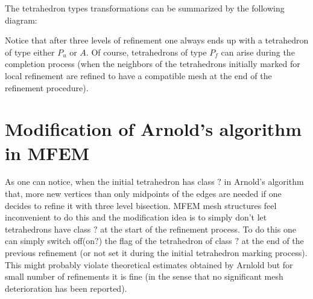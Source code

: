 \documentclass[a4paper,12pt]{amsart}
\numberwithin{equation}{section}
\begin{document}
The tetrahedron types transformations can be summarized by the following diagram:

\begin{center}
\end{center}

Notice that after three levels of refinement one always ends up with a tetrahedron of type either $P_u$ or $A$. Of course, tetrahedrons of type $P_f$ can arise during the completion process (when the neighbors of the tetrahedrons initially marked for local refinement are refined to have a compatible mesh at the end of the refinement procedure).

\section{Modification of Arnold's algorithm in MFEM}

As one can notice, when the initial tetrahedron has class $?$ in Arnold's algorithm that, more new vertices than only midpoints of the edges are needed if one decides to refine it with three level bisection. 
MFEM mesh structures feel inconvenient to do this and the modification idea is to simply don't let tetrahedrons have class $?$ at the start of the refinement process. To do this one can simply switch off(on$?$) the flag of the tetrahedron of class $?$ at the end of the previous refinement (or not set it during the initial tetrahedron marking process).
This might probably violate theoretical estimates obtained by Arnlold but for small number of refinements it is fine (in the sense that no significant mesh deterioration has been reported).
\end{document}
